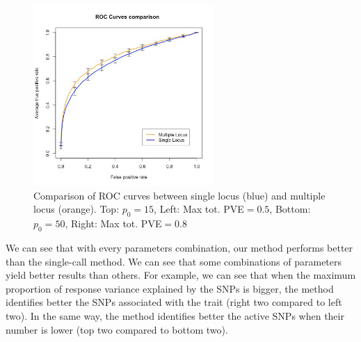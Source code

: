 \documentclass[a4paper, 11pt]{report}
\numberwithin{equation}{chapter}
\begin{document}
\begin{figure}[h!]
\includegraphics[width=2.7in, bb= 0 0 1.7in 1.7in]{images/ROC_Comp_p0_50_var_0_8.jpeg}
\caption{\label{fig:ROCComp}Comparison of ROC curves between single locus (blue) and multiple locus (orange). Top: $p_0 = 15$, Left: Max tot. PVE$ = 0.5$,
Bottom: $p_0 = 50$, Right: Max tot. PVE$ = 0.8$}
\end{figure}

We can see that with every parameters combination, our method performs better than the single-call method. We can see that some combinations of parameters yield better results than others. For example, we can see that when the maximum proportion of response variance explained by the SNPs is bigger, the method identifies better the SNPs associated with the trait (right two compared to left two). In the same way, the method identifies better the active SNPs when their number is lower (top two compared to bottom two).
\end{document}
